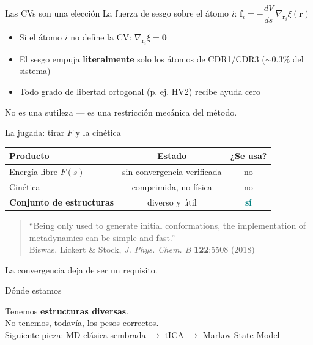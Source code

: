 \documentclass[aspectratio=169,11pt]{beamer}
\newcommand{\Fuente}[1]{{\scriptsize\color{migris} #1}}
\begin{document}
\begin{frame}{Las CVs son una elección}
  La fuerza de sesgo sobre el átomo $i$: $\mathbf{f}_i = -\dfrac{dV}{ds}\,\nabla_{\mathbf{r}_i}\xi(\mathbf{r})$
  \begin{itemize}
    \item Si el átomo $i$ no define la CV: $\nabla_{\mathbf{r}_i}\xi = \mathbf{0}$
    \item El sesgo empuja \textbf{literalmente} solo los átomos de CDR1/CDR3 ($\sim$0.3\% del sistema)
    \item Todo grado de libertad ortogonal (p. ej. HV2) recibe \alert{ayuda cero}
  \end{itemize}
  \vspace{0.5em}
  \Fuente{No es una sutileza — es una restricción mecánica del método.}
\end{frame}

\begin{frame}{La jugada: tirar $F$ y la cinética}
  \begin{center}
  \begin{tabular}{lcc}
    \toprule
    Producto & Estado & ¿Se usa? \\
    \midrule
    Energía libre $F(s)$ & sin convergencia verificada & \textcolor{minaranja}{no} \\
    Cinética & comprimida, no física & \textcolor{minaranja}{no} \\
    \textbf{Conjunto de estructuras} & diverso y útil & \textcolor{teal}{\textbf{sí}} \\
    \bottomrule
  \end{tabular}
  \end{center}
  \vspace{0.8em}
  \begin{quote}
    \small ``Being only used to generate initial conformations, the implementation of metadynamics can be simple and fast.''\\
    \Fuente{Biswas, Lickert \& Stock, \textit{J. Phys. Chem. B} \textbf{122}:5508 (2018)}
  \end{quote}
  \centering \alert{La convergencia deja de ser un requisito.}
\end{frame}

\begin{frame}{Dónde estamos}
  \begin{center}
    \Large
    Tenemos \textbf{estructuras diversas}.\\[0.4em]
    No tenemos, todavía, \alert{los pesos correctos}.\\[1.2em]
    \normalsize\color{migris}
    Siguiente pieza: MD clásica sembrada $\to$ tICA $\to$ Markov State Model
  \end{center}
\end{frame}
\end{document}
